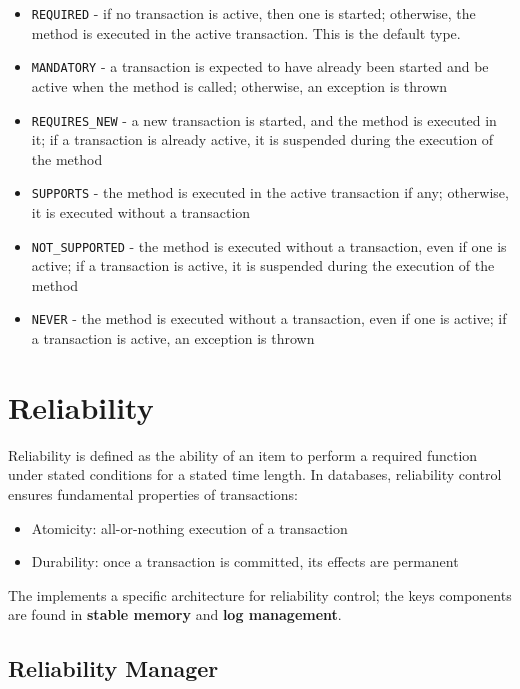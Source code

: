 \documentclass[english]{article}
\begin{document}
\begin{itemize}[label=\texttt{>}]
  \item \texttt{REQUIRED} - if no transaction is active, then one is started; otherwise, the method is executed in the active transaction. This is the default type.
  \item \texttt{MANDATORY} - a transaction is expected to have already been started and be active when the method is called; otherwise, an exception is thrown
  \item \texttt{REQUIRES\_NEW} - a new transaction is started, and the method is executed in it; if a transaction is already active, it is suspended during the execution of the method
  \item \texttt{SUPPORTS} - the method is executed in the active transaction if any; otherwise, it is executed without a transaction
  \item \texttt{NOT\_SUPPORTED} - the method is executed without a transaction, even if one is active; if a transaction is active, it is suspended during the execution of the method
  \item \texttt{NEVER} - the method is executed without a transaction, even if one is active; if a transaction is active, an exception is thrown
\end{itemize}

\clearpage

\section{Reliability}

Reliability is defined as the ability of an item to perform a required function under stated conditions for a stated time length.
In databases, reliability control ensures fundamental properties of transactions:

\begin{itemize}
  \item Atomicity: all-or-nothing execution of a transaction
  \item Durability: once a transaction is committed, its effects are permanent
\end{itemize}

The \dbms implements a specific architecture for reliability control;
the keys components are found in \textbf{stable memory} and \textbf{log management}.

\subsection{Reliability Manager}
\end{document}
